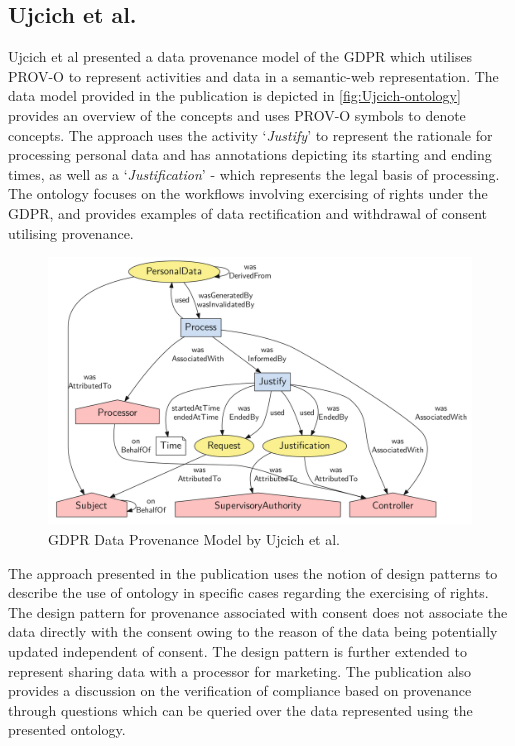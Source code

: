 \subsection*{Ujcich et al.}\label{sec:sota:gdpr-semweb:ujcich}
Ujcich et al \cite{belhajjame_provenance_2018} presented a data provenance model of the GDPR which utilises PROV-O \cite{lebo_prov-o_2013} to represent activities and data in a semantic-web representation.
The data model provided in the publication is depicted in \autoref{fig:Ujcich-ontology} provides an overview of the concepts and uses PROV-O \cite{lebo_prov-o_2013} symbols to denote concepts.
The approach uses the activity `\textit{Justify}' to represent the rationale for processing personal data and has annotations depicting its starting and ending times, as well as a `\textit{Justification}' - which represents the legal basis of processing. The ontology focuses on the workflows involving exercising of rights under the GDPR, and provides examples of data rectification and withdrawal of consent utilising provenance.
\begin{figure}[htbp]
    \centering
    \includegraphics[width=\linewidth]{img/Ujcich_ontology.png}
    \caption{GDPR Data Provenance Model by Ujcich et al. \cite{belhajjame_provenance_2018}}
    \label{fig:Ujcich-ontology}
\end{figure}

The approach presented in the publication uses the notion of design patterns to describe the use of ontology in specific cases regarding the exercising of rights. The design pattern for provenance associated with consent does not associate the data directly with the consent owing to the reason of the data being potentially updated independent of consent. The design pattern is further extended to represent sharing data with a processor for marketing. The publication also provides a discussion on the verification of compliance based on provenance through questions which can be queried over the data represented using the presented ontology.

